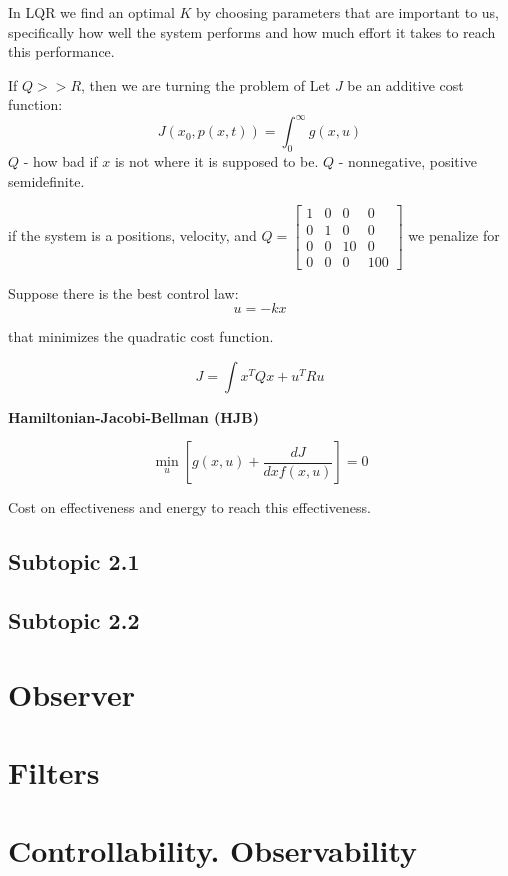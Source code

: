 \documentclass{article}
\begin{document}
In LQR we find an optimal \(K\) by choosing parameters that are important to us, specifically how well the system performs and how much effort it takes to reach this performance.

If \(Q>>R\), then we are turning the problem of 
Let \(J\) be an additive cost function:
\[J(x_0, p(x, t)) = \int_{0}^{\infty} g(x, u)\]
\(Q\) - how bad if \(x\) is not where it is supposed to be.
\(Q\) - nonnegative, positive semidefinite.

if the system is a positions, velocity, and \(Q = \begin{bmatrix} 1 & 0 & 0 & 0 \\ 0 & 1 & 0 & 0 \\ 0 & 0 & 10 & 0 \\ 0 & 0 & 0 & 100 \end{bmatrix}\) we penalize for 

Suppose there is the best control law:
\[u = -kx\]

that minimizes the quadratic cost function.

\[J = \int x^T Q x + u^T R u\]

\textbf{Hamiltonian-Jacobi-Bellman (HJB)}

\[\min_u [g(x, u) + \frac{dJ}{dx f(x, u)}] = 0\]

Cost on effectiveness and energy to reach this effectiveness.

\subsection{Subtopic 2.1}

\subsection{Subtopic 2.2}


\section{Observer}



\section{Filters}


\section{Controllability. Observability}

\end{document}
